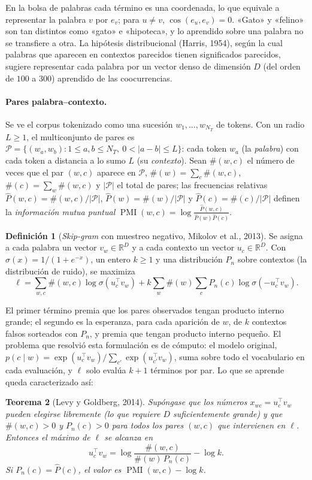 \documentclass[11pt,a4paper]{article}
\theoremstyle{plain}
\newtheorem{teorema}{Teorema}[section]
\theoremstyle{definition}
\newtheorem{definicion}[teorema]{Definición}
\theoremstyle{remark}
\newcommand{\R}{\mathbb{R}}
\newcommand{\PMI}{\operatorname{PMI}}
\newcommand{\1}{\mathbf{1}}
\begin{document}
En la bolsa de palabras cada término es una coordenada, lo que equivale a
representar la palabra $v$ por $e_v$; para $u\ne v$,
$\cos(e_u,e_v)=0$. «Gato» y «felino» son tan distintos como «gato» e
«hipoteca», y lo aprendido sobre una palabra no se transfiere a otra. La
hipótesis distribucional (Harris, 1954), según la cual palabras que
aparecen en contextos parecidos tienen significados parecidos, sugiere
representar cada palabra por un vector denso de dimensión $D$ (del orden de
$100$ a $300$) aprendido de las coocurrencias.

\paragraph{Pares palabra--contexto.} Se ve el corpus tokenizado como una
sucesión $w_1,\dots,w_{N_T}$ de tokens. Con un radio $L\ge1$, el
multiconjunto de pares es $\mathcal P=\{(w_a,w_b):1\le a,b\le N_T,\
0<|a-b|\le L\}$: cada token $w_a$ (la \emph{palabra}) con cada token a
distancia a lo sumo $L$ (su \emph{contexto}). Sean $\#(w,c)$ el número de
veces que el par $(w,c)$ aparece en $\mathcal P$, $\#(w)=\sum_c\#(w,c)$,
$\#(c)=\sum_w\#(w,c)$ y $|\mathcal P|$ el total de pares; las frecuencias
relativas $\hat P(w,c)=\#(w,c)/|\mathcal P|$,
$\hat P(w)=\#(w)/|\mathcal P|$ y $\hat P(c)=\#(c)/|\mathcal P|$ definen la
\emph{información mutua puntual}
$\PMI(w,c)=\log\frac{\hat P(w,c)}{\hat P(w)\hat P(c)}$.

\begin{definicion}[\emph{Skip-gram} con muestreo negativo, Mikolov et al., 2013]
Se asigna a cada palabra un vector $v_w\in\R^D$ y a cada contexto un
vector $u_c\in\R^D$. Con $\sigma(x)=1/(1+e^{-x})$, un entero $k\ge1$ y una
distribución $P_n$ sobre contextos (la distribución de ruido), se maximiza
\[
\ell=\sum_{w,c}\#(w,c)\log\sigma(u_c^\top v_w)+k\sum_w\#(w)\sum_cP_n(c)\log\sigma(-u_c^\top v_w).
\]
\end{definicion}

El primer término premia que los pares observados tengan producto interno
grande; el segundo es la esperanza, para cada aparición de $w$, de $k$
contextos falsos sorteados con $P_n$, y premia que tengan producto interno
pequeño. El problema que resolvió esta formulación es de cómputo: el
modelo original,
$p(c\mid w)=\exp(u_c^\top v_w)/\sum_{c'}\exp(u_{c'}^\top v_w)$, suma sobre
todo el vocabulario en cada evaluación, y $\ell$ solo evalúa $k+1$
términos por par. Lo que se aprende queda caracterizado así:

\begin{teorema}[Levy y Goldberg, 2014]\label{teo:sgns}
Supóngase que los números $x_{wc}=u_c^\top v_w$ pueden elegirse
libremente (lo que requiere $D$ suficientemente grande) y que
$\#(w,c)>0$ y $P_n(c)>0$ para todos los pares $(w,c)$ que intervienen en
$\ell$. Entonces el máximo de $\ell$ se alcanza en
\[
u_c^\top v_w=\log\frac{\#(w,c)}{\#(w)\,P_n(c)}-\log k .
\]
Si $P_n(c)=\hat P(c)$, el valor es $\PMI(w,c)-\log k$.
\end{teorema}
\end{document}
